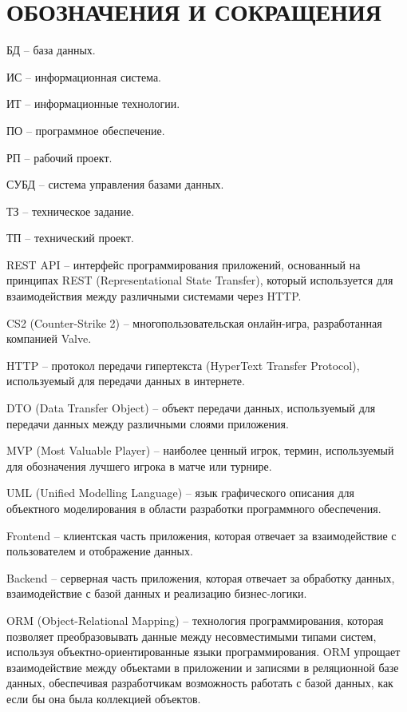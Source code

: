 \newsection
\section*{ОБОЗНАЧЕНИЯ И СОКРАЩЕНИЯ}

БД -- база данных.

ИС -- информационная система.

ИТ -- информационные технологии.

ПО -- программное обеспечение.

РП -- рабочий проект.

СУБД -- система управления базами данных.

ТЗ -- техническое задание.

ТП -- технический проект.

REST API -- интерфейс программирования приложений, основанный на принципах REST (Representational State Transfer), который используется для взаимодействия между различными системами через HTTP.

CS2 (Counter-Strike 2) -- многопользовательская онлайн-игра, разработанная компанией Valve.

HTTP -- протокол передачи гипертекста (HyperText Transfer Protocol), используемый для передачи данных в интернете.

DTO (Data Transfer Object) -- объект передачи данных, используемый для передачи данных между различными слоями приложения.

MVP (Most Valuable Player) -- наиболее ценный игрок, термин, используемый для обозначения лучшего игрока в матче или турнире.

UML (Unified Modelling Language) -- язык графического описания для объектного моделирования в области разработки программного обеспечения.

Frontend -- клиентская часть приложения, которая отвечает за взаимодействие с пользователем и отображение данных.

Backend -- серверная часть приложения, которая отвечает за обработку данных, взаимодействие с базой данных и реализацию бизнес-логики.

ORM (Object-Relational Mapping) -- технология программирования, которая позволяет преобразовывать данные между несовместимыми типами систем, используя объектно-ориентированные языки программирования. ORM упрощает взаимодействие между объектами в приложении и записями в реляционной базе данных, обеспечивая разработчикам возможность работать с базой данных, как если бы она была коллекцией объектов.